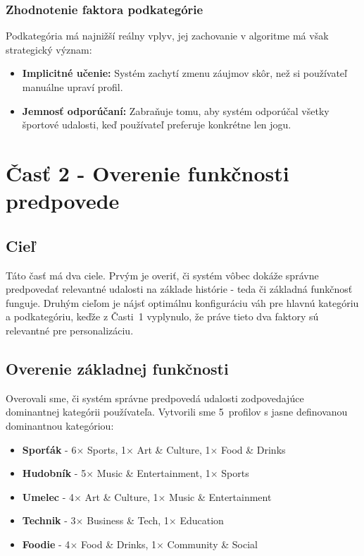 \documentclass[12pt,a4paper]{article}
\begin{document}
\subsubsection{Zhodnotenie faktora podkategórie}

Podkategória má najnižší reálny vplyv, jej zachovanie v algoritme má však
strategický význam:
\begin{itemize}
    \item \textbf{Implicitné učenie:} Systém zachytí zmenu záujmov skôr, než si
    používateľ manuálne upraví profil.
    \item \textbf{Jemnosť odporúčaní:} Zabraňuje tomu, aby systém odporúčal všetky
    športové udalosti, keď používateľ preferuje konkrétne len jogu.
\end{itemize}

\section{Časť 2 - Overenie funkčnosti predpovede}

\subsection{Cieľ}

Táto časť má dva ciele. Prvým je overiť, či systém vôbec dokáže správne predpovedať
relevantné udalosti na základe histórie - teda či základná funkčnosť funguje.
Druhým cieľom je nájsť optimálnu konfiguráciu váh pre hlavnú kategóriu a podkategóriu,
keďže z Časti~1 vyplynulo, že práve tieto dva faktory sú relevantné pre
personalizáciu.

\subsection{Overenie základnej funkčnosti}

Overovali sme, či systém správne predpovedá udalosti zodpovedajúce dominantnej
kategórii používateľa. Vytvorili sme 5~profilov s jasne definovanou dominantnou
kategóriou:

\begin{itemize}
    \item \textbf{Sporťák} - 6$\times$ Sports, 1$\times$ Art \& Culture, 1$\times$ Food \& Drinks
    \item \textbf{Hudobník} - 5$\times$ Music \& Entertainment, 1$\times$ Sports
    \item \textbf{Umelec} - 4$\times$ Art \& Culture, 1$\times$ Music \& Entertainment
    \item \textbf{Technik} - 3$\times$ Business \& Tech, 1$\times$ Education
    \item \textbf{Foodie} - 4$\times$ Food \& Drinks, 1$\times$ Community \& Social
\end{itemize}
\end{document}
